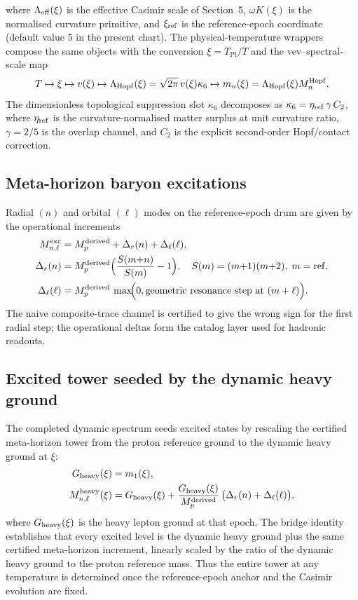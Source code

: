 \documentclass[11pt]{amsart}
\begin{document}
where \(\Lambda_{\rm eff}(\xi)\) is the effective Casimir scale of Section~5, \(\omega K(\xi)\) is the normalised curvature primitive, and \(\xi_{\rm ref}\) is the reference-epoch coordinate (default value 5 in the present chart). The physical-temperature wrappers compose the same objects with the conversion \(\xi=T_{\mathrm{Pl}}/T\) and the vev--spectral-scale map
\[
  T\mapsto \xi\mapsto v(\xi)
  \mapsto \Lambda_{\rm Hopf}(\xi)=\sqrt{2\pi}\,v(\xi)\kappa_6
  \mapsto m_n(\xi)=\Lambda_{\rm Hopf}(\xi)M_n^{\mathrm{Hopf}}.
\]
The dimensionless topological suppression slot $\kappa_6$ decomposes as $\kappa_6=\eta_{\rm ref}\,\gamma\,C_2$, where $\eta_{\rm ref}$ is the curvature-normalised matter surplus at unit curvature ratio, $\gamma=2/5$ is the overlap channel, and $C_2$ is the explicit second-order Hopf/contact correction.

\subsection{Meta-horizon baryon excitations}

Radial $(n)$ and orbital $(\ell)$ modes on the reference-epoch drum are given by the operational increments
\begin{align}
  M_{n,\ell}^{\mathrm{exc}} &=
    M_p^{\mathrm{derived}} +
    \Delta_r(n) + \Delta_\ell(\ell),
  \\
  \Delta_r(n) &=
    M_p^{\mathrm{derived}}\Bigl(\frac{S(m{+}n)}{S(m)}-1\Bigr),\quad
    S(m)=(m{+}1)(m{+}2),\; m=\mathrm{ref},
  \\
  \Delta_\ell(\ell) &=
    M_p^{\mathrm{derived}}\,
    \max\!\Bigl(0,\text{geometric resonance step at }(m+\ell)\Bigr).
\end{align}
The naive composite-trace channel is certified to give the wrong sign for the first radial step; the operational deltas form the catalog layer used for hadronic readouts.

\subsection{Excited tower seeded by the dynamic heavy ground}

The completed dynamic spectrum seeds excited states by rescaling the certified meta-horizon tower from the proton reference ground to the dynamic heavy ground at $\xi$:
\begin{align}
  G_{\rm heavy}(\xi) &=
    m_1(\xi),
  \\
  M_{n,\ell}^{\mathrm{heavy}}(\xi) &=
    G_{\rm heavy}(\xi) + \frac{G_{\rm heavy}(\xi)}{M_p^{\mathrm{derived}}}\,
    \bigl(\Delta_r(n) + \Delta_\ell(\ell)\bigr),
\end{align}
where $G_{\rm heavy}(\xi)$ is the heavy lepton ground at that epoch. The bridge identity establishes that every excited level is the dynamic heavy ground plus the same certified meta-horizon increment, linearly scaled by the ratio of the dynamic heavy ground to the proton reference mass. Thus the entire tower at any temperature is determined once the reference-epoch anchor and the Casimir evolution are fixed.
\end{document}
